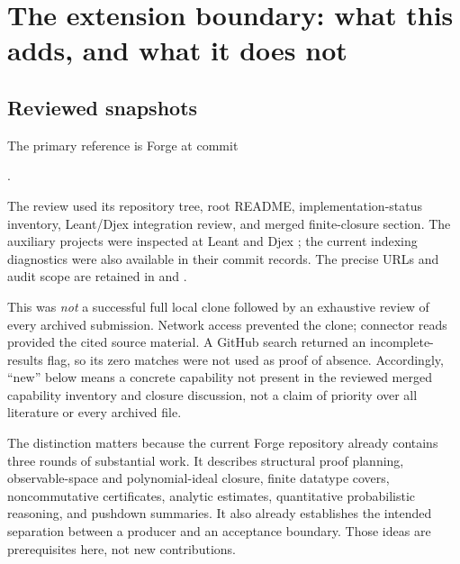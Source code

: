 \documentclass[11pt,a4paper]{article}
\theoremstyle{definition}
\begin{document}
\section{The extension boundary: what this adds, and what it does not}
\label{sec:delta}

\subsection{Reviewed snapshots}
The primary reference is Forge at commit
\begin{center}\small{}.\end{center}
The review used its repository tree, root README, implementation-status
inventory, Leant/Djex integration review, and merged finite-closure section.
The auxiliary projects were inspected at Leant
 and Djex
; the current indexing diagnostics
were also available in their commit records. The precise URLs and audit scope
are retained in  and
.\cite{forge,forgestatus,forgeclosure,leant,djex}

This was \emph{not} a successful full local clone followed by an exhaustive
review of every archived submission. Network access prevented the clone;
connector reads provided the cited source material. A GitHub search returned
an incomplete-results flag, so its zero matches were not used as proof of
absence. Accordingly, ``new'' below means a concrete capability not present in
the reviewed merged capability inventory and closure discussion, not a claim
of priority over all literature or every archived file.

The distinction matters because the current Forge repository already contains
three rounds of substantial work. It describes structural proof planning,
observable-space and polynomial-ideal closure, finite datatype covers,
noncommutative certificates, analytic estimates, quantitative probabilistic
reasoning, and pushdown summaries. It also already establishes the intended
separation between a producer and an acceptance boundary. Those ideas are
prerequisites here, not new contributions.\cite{forgestatus,forgeclosure}
\end{document}
